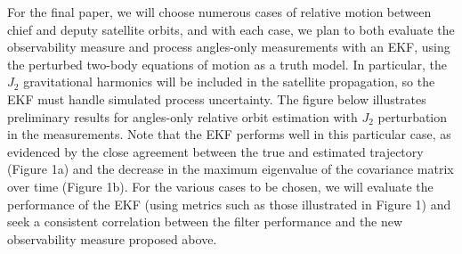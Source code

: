 \documentclass[letterpaper, preprint, paper,11pt]{AAS}	%
\begin{document}
For the final paper, we will choose numerous cases of relative motion between chief and deputy satellite orbits, and with each case, we plan to both evaluate the observability measure and process angles-only measurements with an EKF, using the perturbed two-body equations of motion as a truth model.
In particular, the $J_2$ gravitational harmonics will be included in the satellite propagation, so the EKF must handle simulated process uncertainty.
The figure below illustrates preliminary results for angles-only relative orbit estimation with $J_2$ perturbation in the measurements.
Note that the EKF performs well in this particular case, as evidenced by the close agreement between the true and estimated trajectory (Figure 1a) and the decrease in the maximum eigenvalue of the covariance matrix over time (Figure 1b).
For the various cases to be chosen, we will evaluate the performance of the EKF (using metrics such as those illustrated in Figure 1) and seek a consistent correlation between the filter performance and the new observability measure proposed above.
\end{document}
